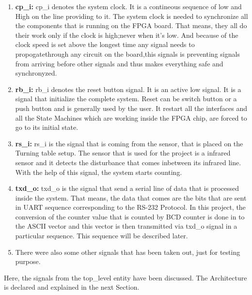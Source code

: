 \documentclass[12pt,a4paper]{article}
\begin{document}
\begin{enumerate}
\item \textbf{cp\_i:} cp\_i denotes the system clock. It is a contineous sequence of low and High on the line providing to it. The system clock is needed to synchronize all the components that is running on the FPGA board. That means, they all do their work only if the clock is high;never when it’s low. And because of the clock speed is set above the longest time any signal needs to propogatethrough any circuit on the board,this signals is preventing signals from arriving before other signals and thus makes everything safe and synchronyzed.

\item \textbf{rb\_i:} rb\_i denotes the reset button signal. It is an active low signal. It is a signal that initialize the complete system. Reset can be switch button or a push button and is generally used by the user. It restart all the interfaces and all the State Machines which are working inside the FPGA chip, are forced to go to its initial state. 

\item \textbf{rs\_i:} rs\_i is the signal that is coming from the sensor, that is placed on the Turning table setup. The sensor that is used for the project is a infrared sensor and it detects the disturbance that comes inbetween its infrared line. With the help of this signal, the system starts counting.

\item \textbf{txd\_o:} txd\_o is the signal that send a serial line of data that is processed inside the system. That means, the data that comes are the bits that are sent in UART sequence corresponding to the RS-232 Protocol. In this project, the conversion of the counter value that is counted by BCD counter is done in to the ASCII vector and this vector is then transmitted via txd\_o signal in a particular sequence. This sequence will be described later.

\item There were also some other signals that has been taken out, just for testing purpose.
\end{enumerate}

Here, the signals from the top\_level entity have been discussed. The Architecture is declared and explained in the next Section.\
\end{document}
